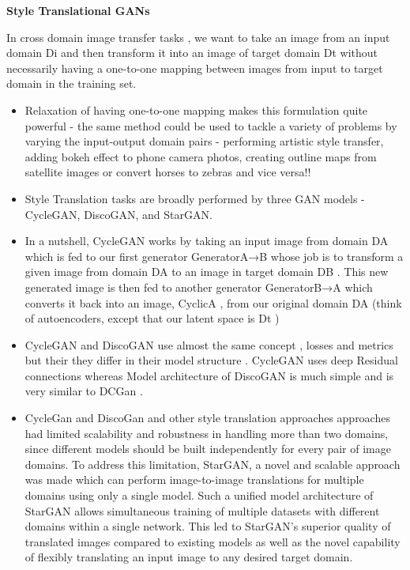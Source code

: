 \documentclass{article}
\begin{document}
\begin{center}
    {\Large{\textbf{Style Translational GANs}}}
\end{center}
In cross domain image transfer tasks , we want to take an image from an input domain  Di  and then transform it into an image of target domain  Dt without necessarily having a one-to-one mapping between images from input to target domain in the training set.
\begin{itemize}
    \item Relaxation of having one-to-one mapping makes this formulation quite powerful - the same method could be used to tackle a variety of problems by varying the input-output domain pairs - performing artistic style transfer, adding bokeh effect to phone camera photos, creating outline maps from satellite images or convert horses to zebras and vice versa!! 
    \item Style Translation tasks are broadly performed by three GAN models - CycleGAN, DiscoGAN, and StarGAN.
    \item In a nutshell, CycleGAN works by taking an input image from domain  DA  which is fed to our first generator  GeneratorA→B  whose job is to transform a given image from domain  DA  to an image in target domain  DB . This new generated image is then fed to another generator  GeneratorB→A  which converts it back into an image,  CyclicA , from our original domain  DA  (think of autoencoders, except that our latent space is  Dt )
    \item CycleGAN and DiscoGAN use almost the same concept , losses and metrics but their they differ in their model structure . CycleGAN uses deep Residual connections whereas Model architecture of DiscoGAN is much simple and is very similar to DCGan . 
    \item CycleGan and DiscoGan and other style translation approaches approaches had limited scalability and robustness in handling more than two domains, since different models should be built independently for every pair of image domains. To address this limitation, StarGAN, a novel and scalable approach was made which can perform image-to-image translations for multiple domains using only a single model. Such a unified model architecture of StarGAN allows simultaneous training of multiple datasets with different domains within a single network. This led to StarGAN’s superior quality of translated images compared to existing models as well as the novel capability of flexibly translating an input image to any desired target domain.
\end{itemize}
\end{document}
